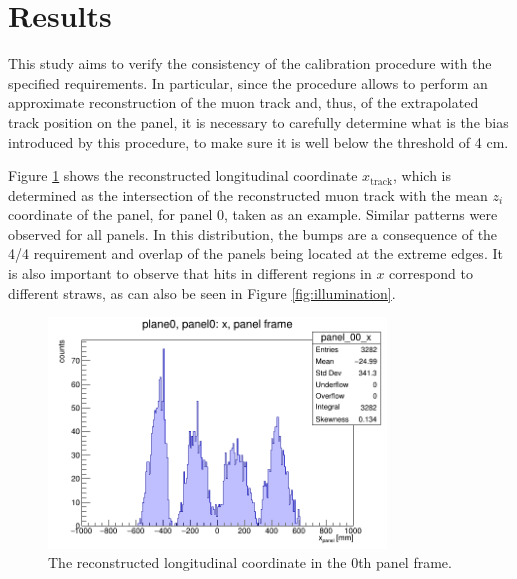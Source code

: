 \section{Results}

This study aims to verify the consistency of the 
calibration procedure with the specified requirements. In particular, since the 
procedure allows to perform an approximate reconstruction 
of the muon track and, thus, of the extrapolated track 
position on the panel, it is necessary to carefully determine 
what is the bias introduced by this procedure,  
to make sure it is well below the threshold of 4 cm.  

Figure \ref{fig:recx} shows the reconstructed 
longitudinal coordinate $x_{\text{track}}$, which is 
determined as the intersection of the reconstructed 
muon track with the mean $z_i$ coordinate of the panel, for panel 0, taken as an example.
Similar patterns were observed for all panels. In this distribution, the bumps 
are a consequence of the 4/4 requirement and overlap of the panels  
being located at the extreme edges. It is also important to observe that 
hits in different regions in $x$ correspond to different 
straws, as can also be seen in Figure \ref{fig:illumination}. 

\begin{figure}[!h]
    \centering
    \includegraphics[width=0.8\textwidth]{figures/png/x_panel0.png}
    \caption[The reconstructed longitudinal coordinate in the 0th panel frame.]{The reconstructed longitudinal coordinate in the 0th panel frame.}
    \label{fig:recx}
\end{figure}

